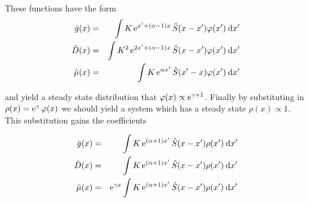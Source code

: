 \documentclass[../main.tex]{subfiles}
\begin{document}
  These functions have the form
  \begin{eqnarray}
    \hat{g}(x) &=& \int K \operatorname{e}^{x' + (\alpha - 1)x} \hat{S}(x - x') \varphi(x') \: \mathrm{d}x' \\
    \hat{D}(x) &=& \int K^2 \operatorname{e}^{2x' + (\alpha - 1)x} \hat{S}(x - x') \varphi(x') \: \mathrm{d}x' \\
    \hat{\mu}(x) &=& \int K \operatorname{e}^{\alpha x'} \hat{S}(x' - x) \varphi(x') \: \mathrm{d}x'
  \end{eqnarray}

  and yield a steady state distribution that $\varphi(x) \propto \operatorname{e}^{\gamma + 1}$. Finally by substituting in $\rho(x) = \operatorname{e}^{\gamma} \varphi(x)$ we should yield a system which has a steady state $\rho(x) \propto 1$. This substitution gains the coefficients

  \begin{eqnarray}
    \bar{g}(x) &=& \int K \operatorname{e}^{(\alpha + 1)x'} \hat{S}(x - x') \rho(x') \: \mathrm{d}x' \\
    \bar{D}(x) &=& \int K \operatorname{e}^{(\alpha + 1)x'} \hat{S}(x - x') \rho(x') \: \mathrm{d}x' \\
    \bar{\mu}(x) &=& \operatorname{e}^{\gamma x}\int K \operatorname{e}^{(\alpha + 1)x'} \hat{S}(x - x') \rho(x') \: \mathrm{d}x'
  \end{eqnarray}
\end{document}
